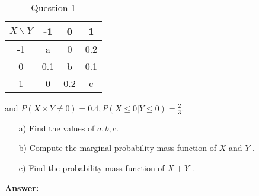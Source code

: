 \documentclass[hidelinks]{article}
\begin{document}
\begin{table}[H]
    \centering
    \begin{tabular}{|c|c|c|c|}
        \hline
        $X\backslash Y$ & -1 & 0 & 1\\ \hline
        -1 & a   & 0   & 0.2\\ \hline
        0  & 0.1 & b   & 0.1\\ \hline
        1  & 0   & 0.2 & c  \\ \hline
    \end{tabular}
    \caption{Question 1}
\end{table}
and $P(X \times Y \neq 0) = 0.4, P(X \leq 0|Y \leq 0) = \frac{2}{3}$.
\begin{enumerate}
    \item[a)] Find the values of $a, b, c$.
    \item[b)] Compute the marginal probability mass function of $X$ and $Y$ .
    \item[c)] Find the probability mass function of $X + Y$ .
\end{enumerate}
\textbf{Answer:}
\end{document}
